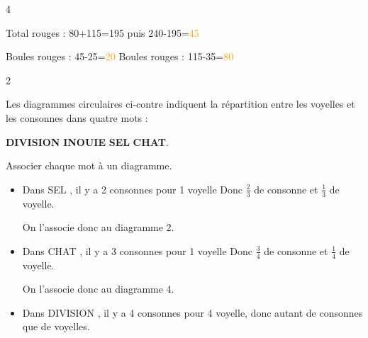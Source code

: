 \documentclass[a4paper]{book}
\begin{document}
{\begin{exerciceNote}{4}
\begin{minipage}{0.49\linewidth}
            Total rouges : 80+115=195 puis 240-195=\textcolor{orange}{45}
        \end{minipage}     

        \bigskip

        Boules rouges : 45-25=\textcolor{orange}{20}
        \quad \quad 
        Boules rouges : 115-35=\textcolor{orange}{80}
    \end{exerciceNote}


    \begin{exerciceNote}{2}
        \begin{minipage}{0.3\linewidth}
            \begin{center}
            \end{center}
        \end{minipage}
        \hfill
        \begin{minipage}{0.49\linewidth}
            Les diagrammes circulaires ci-contre indiquent la répartition entre les voyelles et les consonnes dans quatre mots : 
            
            \textbf{DIVISION} \textperiodcentered{} \textbf{INOUIE} \textperiodcentered{} \textbf{SEL} \textperiodcentered{} \textbf{CHAT}.

            \medskip

            Associer chaque mot à un diagramme.

            \begin{itemize}
                \item Dans \og SEL \fg, il y a 2 consonnes pour 1 voyelle
                Donc $\frac{2}{3}$ de consonne et $\frac{1}{3}$ de voyelle.

                On l'associe donc au diagramme 2.

                \item Dans \og CHAT \fg, il y a 3 consonnes pour 1 voyelle
                Donc $\frac{3}{4}$ de consonne et $\frac{1}{4}$ de voyelle.

                On l'associe donc au diagramme 4.
            \end{itemize}
        \end{minipage}

        \begin{itemize}
            \item Dans \og DIVISION \fg, il y a 4 consonnes pour 4 voyelle, donc autant de consonnes que de voyelles.
            

\end{itemize}
\end{exerciceNote}}
\end{document}
